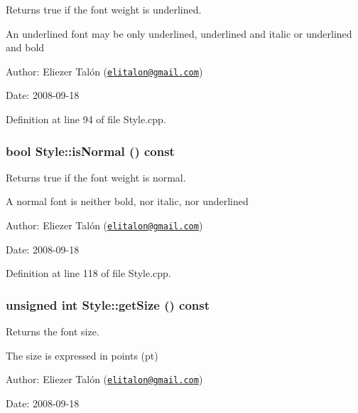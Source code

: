 Returns true if the font weight is underlined. 

An underlined font may be only underlined, underlined and italic or underlined and bold

\begin{Desc}
\item[Author:]Eliezer Talón (\href{mailto:elitalon@gmail.com}{\tt elitalon@gmail.com}) \end{Desc}
\begin{Desc}
\item[Date:]2008-09-18 \end{Desc}


Definition at line 94 of file Style.cpp.\hypertarget{class_style_db2cbc7ca50b2f5c632c8e9b0420044c}{
\subsubsection[isNormal]{\setlength{\rightskip}{0pt plus 5cm}bool Style::isNormal () const}}
\label{class_style_db2cbc7ca50b2f5c632c8e9b0420044c}


Returns true if the font weight is normal. 

A normal font is neither bold, nor italic, nor underlined

\begin{Desc}
\item[Author:]Eliezer Talón (\href{mailto:elitalon@gmail.com}{\tt elitalon@gmail.com}) \end{Desc}
\begin{Desc}
\item[Date:]2008-09-18 \end{Desc}


Definition at line 118 of file Style.cpp.\hypertarget{class_style_9356c4a5d30f4e0f5c86f8c8b3f36cd2}{
\subsubsection[getSize]{\setlength{\rightskip}{0pt plus 5cm}unsigned int Style::getSize () const}}
\label{class_style_9356c4a5d30f4e0f5c86f8c8b3f36cd2}


Returns the font size. 

The size is expressed in points (pt)

\begin{Desc}
\item[Author:]Eliezer Talón (\href{mailto:elitalon@gmail.com}{\tt elitalon@gmail.com}) \end{Desc}
\begin{Desc}
\item[Date:]2008-09-18 \end{Desc}


